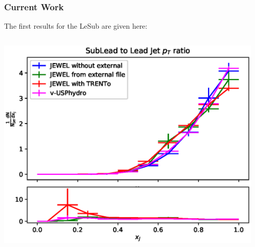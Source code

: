 \documentclass{beamer}
\begin{document}
\begin{frame}\frametitle{Current Work}
	\begin{minipage}{1\textwidth}
	The first results for the LeSub are given here:
    \end{minipage}
    \begin{columns}
    \begin{column}{0.5\textwidth}
	\begin{minipage}[l]{0.5\textwidth}
	\includegraphics[scale=0.4]{images/LeadToSub.eps}
	\end{minipage}
	\end{column}
    \begin{column}{0.4\textwidth}
	\begin{minipage}[r]{1\textwidth}
	
	\end{minipage}
	\end{column}
	\end{columns}
\end{frame}
\end{document}
